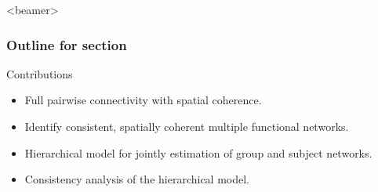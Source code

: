 \documentclass[sansserif, 10pt]{beamer}
\begin{document}
\begin{frame}<beamer>
  \frametitle{Outline for section \thesection}
  \tableofcontents[currentsection, sectionstyle=show/hide, subsectionstyle=show/show/hide]

  \begin{block}{Contributions}
    \begin{itemize}
    \item \alert{Full pairwise connectivity with spatial coherence.}
    \item Identify consistent, spatially coherent multiple functional networks.
    \item Hierarchical model for jointly estimation of group and subject networks.
    \item Consistency analysis of the hierarchical model.
    \end{itemize}
  \end{block}

\end{frame}
\end{document}

